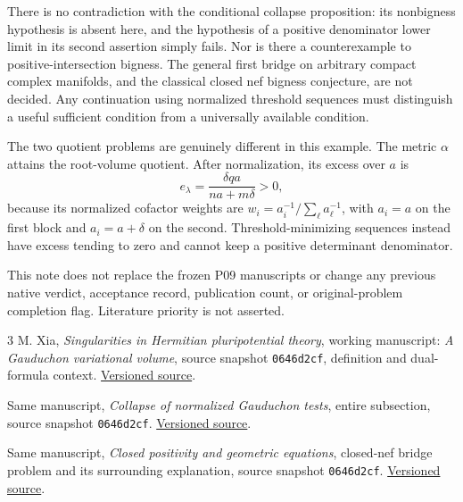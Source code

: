 \documentclass[11pt]{article}
\begin{document}
There is no contradiction with the conditional collapse proposition:
its nonbigness hypothesis is absent here, and the hypothesis of a positive
denominator lower limit in its second assertion simply fails.
Nor is there a counterexample to positive-intersection bigness.
The general first bridge on arbitrary compact complex manifolds,
and the classical closed nef bigness conjecture, are not decided.
Any continuation using normalized threshold sequences must distinguish
a useful sufficient condition from a universally available condition.

The two quotient problems are genuinely different in this example.
The metric \(\alpha\) attains the root-volume quotient. After normalization,
its excess over \(a\) is
\[
 e_\lambda=\frac{\delta q a}{na+m\delta}>0,
\]
because its normalized cofactor weights are
\(w_i=a_i^{-1}/\sum_\ell a_\ell^{-1}\), with \(a_i=a\) on the first
block and \(a_i=a+\delta\) on the second. Threshold-minimizing
sequences instead have excess tending to zero and cannot keep a positive
determinant denominator.

This note does not replace the frozen P09 manuscripts or change any
previous native verdict, acceptance record, publication count, or
original-problem completion flag. Literature priority is not asserted.

\begin{thebibliography}{3}
M. Xia, \emph{Singularities in Hermitian pluripotential theory},
working manuscript: \emph{A Gauduchon variational volume},
source snapshot \texttt{0646d2cf}, definition and dual-formula context.
\href{https://github.com/MingchenXia/non-kahler-pluripotential-theory/blob/0646d2cf9d9bb10e15bc357305cce3c58ecb4741/book/author/chapter_gauduchon_variational_volume.tex}{Versioned source}.

Same manuscript, \emph{Collapse of normalized Gauduchon tests},
entire subsection, source snapshot \texttt{0646d2cf}.
\href{https://github.com/MingchenXia/non-kahler-pluripotential-theory/blob/0646d2cf9d9bb10e15bc357305cce3c58ecb4741/book/author/section_gauduchon_collapse.tex}{Versioned source}.

Same manuscript, \emph{Closed positivity and geometric equations},
closed-nef bridge problem and its surrounding explanation,
source snapshot \texttt{0646d2cf}.
\href{https://github.com/MingchenXia/non-kahler-pluripotential-theory/blob/0646d2cf9d9bb10e15bc357305cce3c58ecb4741/book/author/section_non_kahler_geometry.tex}{Versioned source}.
\end{thebibliography}
\end{document}
